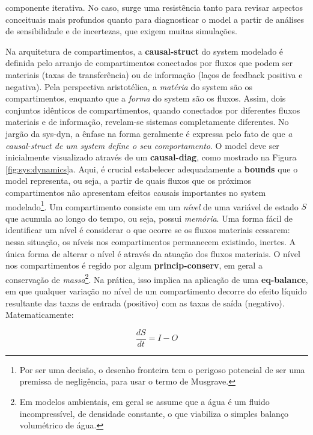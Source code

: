 \documentclass[./main.tex]{subfiles}
\begin{document}
componente iterativa. No caso, surge uma resistência tanto para revisar aspectos conceituais mais profundos quanto para diagnosticar o \gls{model} a partir de análises de sensibilidade e de incertezas, que exigem muitas simulações.

\par Na arquitetura de compartimentos, a \textbf{\gls{causal-struct}} do \gls{system} modelado é definida pelo arranjo de compartimentos conectados por fluxos que podem ser materiais (taxas de transferência) ou de informação (laços de \gls{feedback} positiva e negativa). Pela perspectiva aristotélica, a \textit{matéria} do \gls{system} são os compartimentos, enquanto que a \textit{forma} do \gls{system} são os fluxos. Assim, dois conjuntos idênticos de compartimentos, quando conectados por diferentes fluxos materiais e de informação, revelam-se sistemas completamente diferentes. No jargão da \gls{sys-dyn}, a ênfase na forma geralmente é expressa pelo fato de que \textit{a \gls{causal-struct} de um \gls{system} define o seu comportamento}. O \gls{model} deve ser inicialmente visualizado através de um \textbf{\gls{causal-diag}}, como mostrado na Figura \ref{fig:sys:dynamics}a. Aqui, é crucial estabelecer adequadamente a \textbf{\gls{bounds}} que o \gls{model} representa, ou seja, a partir de quais fluxos que os próximos compartimentos não apresentam efeitos causais importantes no \gls{system} modelado\footnote{Por ser uma decisão, o desenho fronteira tem o perigoso potencial de ser uma premissa de negligência, para usar o termo de Musgrave.}. Um compartimento consiste em um \textit{nível} de uma variável de estado $S$ que acumula ao longo do tempo, ou seja, possui \textit{memória}. Uma forma fácil de identificar um nível é considerar o que ocorre se os fluxos materiais cessarem: nessa situação, os níveis nos compartimentos permanecem existindo, inertes. A única forma de alterar o nível é através da atuação dos fluxos materiais. O nível nos compartimentos é regido por algum \textbf{\gls{princip-conserv}}, em geral a conservação de \textit{massa}\footnote{Em modelos ambientais, em geral se assume que a água é um fluido incompressível, de densidade constante, o que viabiliza o simples balanço volumétrico de água.}. Na prática, isso implica na aplicação de uma \textbf{\gls{eq-balance}}, em que qualquer variação no nível de um compartimento decorre do efeito líquido resultante das taxas de entrada (positivo) com as taxas de saída (negativo). Matematicamente:
\begin{linenomath*}
\begin{equation}
\label{eq:balance}
\frac{dS}{dt} = I - O 
\end{equation}
\end{linenomath*}
\end{document}
